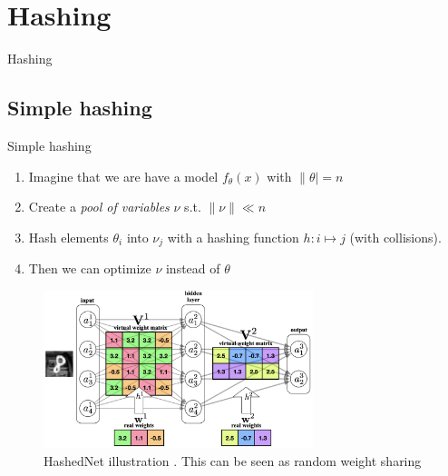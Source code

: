 \documentclass[10pt, handout]{beamer}
\begin{document}
\section{Hashing}
\begin{frame}
    Hashing
\end{frame}

\subsection{Simple hashing}
\begin{frame}{Simple hashing}
\begin{enumerate}
    \pause\item Imagine that we are have a model $f_\theta(x)$ with $\|\theta| = n$
    \pause\item Create a \textit{pool of variables} $\nu$ s.t. $\| \nu \| \ll n$
    \pause\item Hash elements $\theta_i$ into $\nu_j$ with a hashing function $h:i \mapsto j$ (with collisions).
    \pause\item Then we can optimize $\nu$ instead of $\theta$
\end{enumerate}

\pause
\begin{figure}
    \centering
    \includegraphics[width=0.7\textwidth]{images/hashednet.png}
    \caption{HashedNet illustration \cite{HashedNet}. This can be seen as random weight sharing}
    \label{fig:hashed_net}
\end{figure}
\end{frame}
\end{document}
